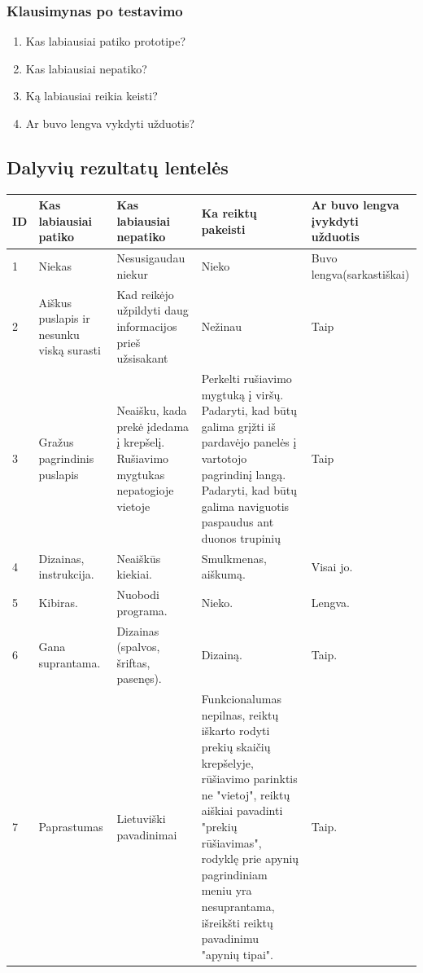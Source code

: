 \documentclass[oneside]{VUMIFPSkursinis}
\begin{document}
	\subsubsection{Klausimynas po testavimo}
	\begin{enumerate}
			\item{Kas labiausiai patiko prototipe?}
			\item{Kas labiausiai nepatiko?}
			\item{Ką labiausiai reikia keisti?}
			\item{Ar buvo lengva vykdyti užduotis?}
	\end{enumerate}
	
	\subsection{Dalyvių rezultatų lentelės}
\begin{center}
    \begin{tabular}{ |p{1cm} | p{3cm} | p{4cm} | p{4cm} | p{3cm} |}
    \hline
	ID&Kas labiausiai patiko&Kas labiausiai nepatiko&Ka reiktų pakeisti&Ar buvo lengva įvykdyti užduotis\\ \hline
	1&Niekas&Nesusigaudau niekur&Nieko&Buvo lengva(sarkastiškai) \\ \hline
	2&Aiškus puslapis ir nesunku viską surasti&Kad reikėjo užpildyti daug informacijos prieš užsisakant&Nežinau&Taip \\ \hline
	3&Gražus pagrindinis puslapis&Neaišku, kada prekė įdedama į krepšelį. Rušiavimo mygtukas nepatogioje vietoje&Perkelti rušiavimo mygtuką į viršų. Padaryti, kad būtų galima grįžti iš pardavėjo panelės į vartotojo pagrindinį langą. Padaryti, kad būtų galima naviguotis paspaudus ant duonos trupinių&Taip \\ \hline
	4&Dizainas, instrukcija.&Neaiškūs kiekiai.&Smulkmenas, aiškumą.&Visai jo. \\ \hline
	5&Kibiras.&Nuobodi programa.&Nieko.&Lengva. \\ \hline
	6&Gana suprantama.&Dizainas (spalvos, šriftas, pasenęs).&Dizainą.&Taip. \\ \hline
	7&Paprastumas&Lietuviški pavadinimai&Funkcionalumas nepilnas, reiktų iškarto rodyti prekių skaičių krepšelyje, rūšiavimo parinktis ne "vietoj", reiktų aiškiai pavadinti "prekių rūšiavimas", rodyklę prie apynių pagrindiniam meniu yra nesuprantama, išreikšti reiktų pavadinimu "apynių tipai".&Taip. \\ \hline
   \hline
    \end{tabular}
\end{center}
\end{document}
